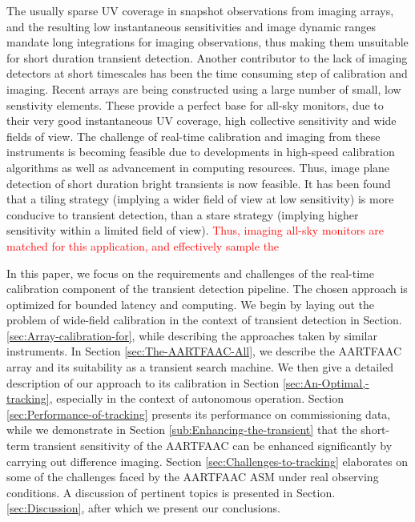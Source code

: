 \documentclass{aa}
\begin{document}
The usually sparse UV coverage in snapshot observations from imaging
arrays, and the resulting low instantaneous sensitivities and image
dynamic ranges mandate long integrations for imaging observations,
thus making them unsuitable for short duration transient detection.
Another contributor to the lack of imaging detectors at short timescales
has been the time consuming step of calibration and imaging. Recent
arrays are being constructed using a large number of small, low senstivity
elements. These provide a perfect base for all-sky monitors, due to
their very good instantaneous UV coverage, high collective sensitivity
and wide fields of view. The challenge of real-time calibration and
imaging from these instruments is becoming feasible due to developments
in high-speed calibration algorithms as well as advancement in computing
resources. Thus, image plane detection of short duration bright transients
is now feasible. It has been found that a tiling strategy (implying
a wider field of view at low sensitivity) is more conducive to transient
detection, than a stare strategy (implying higher sensitivity within
a limited field of view)\citep{nemiroff2003tile}. \textcolor{red}{Thus,
imaging all-sky monitors are matched for this application, and effectively
sample the }

In this paper, we focus on the requirements and challenges of the
real-time calibration component of the transient detection pipeline.
The chosen approach is optimized for bounded latency and computing.
We begin by laying out the problem of wide-field calibration in the
context of transient detection in Section. \ref{sec:Array-calibration-for},
while describing the approaches taken by similar instruments. In Section
\ref{sec:The-AARTFAAC-All}, we describe the AARTFAAC array and its
suitability as a transient search machine. We then give a detailed
description of our approach to its calibration in Section \ref{sec:An-Optimal,-tracking},
especially in the context of autonomous operation. Section \ref{sec:Performance-of-tracking}
presents its performance on commissioning data, while we demonstrate
in Section \ref{sub:Enhancing-the-transient} that the short-term
transient sensitivity of the AARTFAAC can be enhanced significantly
by carrying out difference imaging. Section \ref{sec:Challenges-to-tracking}
elaborates on some of the challenges faced by the AARTFAAC ASM under
real observing conditions. A discussion of pertinent topics is presented
in Section. \ref{sec:Discussion}, after which we present our conclusions.
\end{document}
